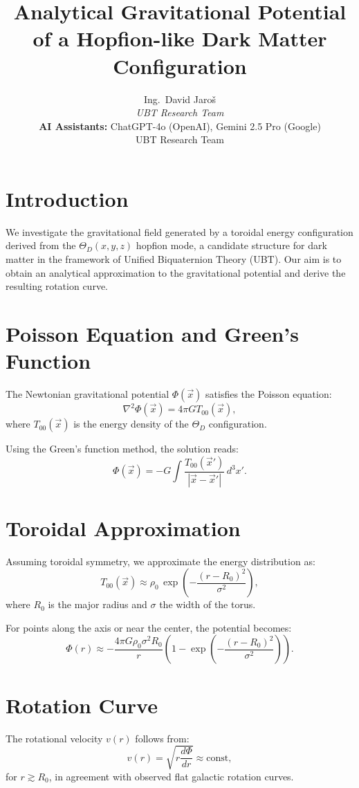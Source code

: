 \documentclass[12pt]{article}
\title{Analytical Gravitational Potential of a Hopfion-like Dark Matter Configuration}
\author{
Ing.~David Jaroš \\
\textit{UBT Research Team} \\
\textbf{AI Assistants:} ChatGPT-4o (OpenAI), Gemini 2.5 Pro (Google) \\
UBT Research Team}
\date{}
\begin{document}
\maketitle

\section*{Introduction}

We investigate the gravitational field generated by a toroidal energy configuration derived from the $\Theta_D(x, y, z)$ hopfion mode, a candidate structure for dark matter in the framework of Unified Biquaternion Theory (UBT). Our aim is to obtain an analytical approximation to the gravitational potential and derive the resulting rotation curve.

\section*{Poisson Equation and Green's Function}

The Newtonian gravitational potential $\Phi(\vec{x})$ satisfies the Poisson equation:
\[
\nabla^2 \Phi(\vec{x}) = 4\pi G T_{00}(\vec{x}),
\]
where $T_{00}(\vec{x})$ is the energy density of the $\Theta_D$ configuration.

Using the Green's function method, the solution reads:
\[
\Phi(\vec{x}) = -G \int \frac{T_{00}(\vec{x}')}{|\vec{x} - \vec{x}'|} \, d^3x'.
\]

\section*{Toroidal Approximation}

Assuming toroidal symmetry, we approximate the energy distribution as:
\[
T_{00}(\vec{x}) \approx \rho_0 \, \exp\left(- \frac{(r - R_0)^2}{\sigma^2} \right),
\]
where $R_0$ is the major radius and $\sigma$ the width of the torus.

For points along the axis or near the center, the potential becomes:
\[
\Phi(r) \approx -\frac{4\pi G \rho_0 \sigma^2 R_0}{r} \left(1 - \exp\left(-\frac{(r - R_0)^2}{\sigma^2}\right)\right).
\]

\section*{Rotation Curve}

The rotational velocity $v(r)$ follows from:
\[
v(r) = \sqrt{r \frac{d\Phi}{dr}} \approx \text{const},
\]
for $r \gtrsim R_0$, in agreement with observed flat galactic rotation curves.
\end{document}
